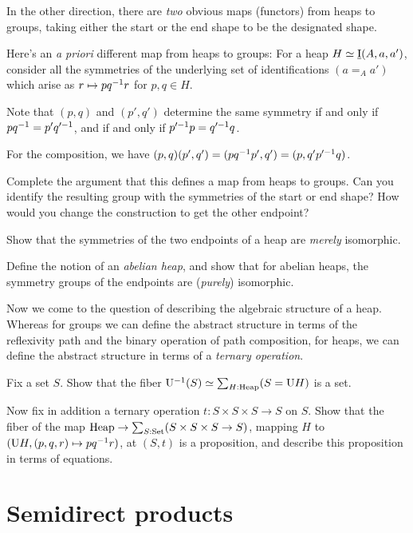 In the other direction,
there are \emph{two} obvious maps (functors) from heaps to groups,
taking either the start or the end shape to be the designated shape.

Here's an \emph{a priori} different map from heaps to groups:
For a heap $H \jdeq \mkheap(A,a,a')$, consider all the
symmetries of the underlying set of identifications $(a=_Aa')$
which arise as $r \mapsto pq^{-1} r$ for $p,q\in H$.

Note that $(p,q)$ and $(p',q')$ determine the same symmetry
if and only if $pq^{-1} = p'q'^{-1}$, and if and only if
$p'^{-1}p = q'^{-1}q$.

For the composition, we have $(p,q)(p',q') = (pq^{-1}p',q') = (p,q'p'^{-1}q)$.

\begin{exercise}
  Complete the argument that this defines a map
  from heaps to groups. Can you identify the resulting group
  with the symmetries of the start or end shape?
  How would you change the construction to get the other endpoint?
\end{exercise}

\begin{exercise}
  Show that the symmetries of the two endpoints of a heap
  are \emph{merely} isomorphic.

  Define the notion of an \emph{abelian heap},
  and show that for abelian heaps,
  the symmetry groups of the endpoints are (\emph{purely}) isomorphic.
\end{exercise}

Now we come to the question of describing the algebraic structure
of a heap.
Whereas for groups we can define the abstract structure
in terms of the reflexivity path and the binary operation of path composition,
for heaps, we can define the abstract structure
in terms of a \emph{ternary operation}.

\begin{exercise}\label{xca:heap-variety}
  Fix a set $S$.
  Show that the fiber $\inv{\USym}(S)\jdeq\sum_{H:\Heap}(S=\USym H)$ is a set.

  Now fix in addition a ternary operation $t:S\times S\times S\to S$ on $S$.
  Show that the fiber of the map $\mathrm{Heap} \to \sum_{S:\mathrm{Set}}(S\times S\times S \to S)$,
  mapping $H$ to $(\mathrm{U} H,(p,q,r)\mapsto p q^{-1} r)$,
  at $(S,t)$ is a proposition,
  and describe this proposition in terms of equations.
\end{exercise}

\section{Semidirect products}
\label{sec:Semidirect-products}

